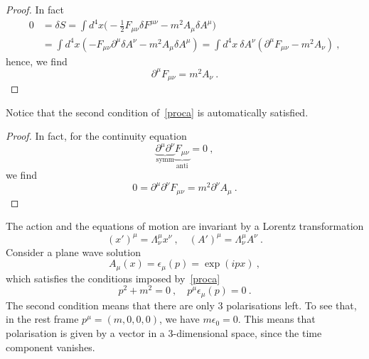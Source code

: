     \begin{proof}
        In fact 
        \begin{equation*}
        \begin{aligned}
            0 & = \delta S = \int d^4 x \Big (- \frac{1}{2} F_{\mu\nu} \delta F^{\mu\nu} - m^2 A_\mu \delta A^\mu \Big ) \\ & = \int d^4 x (-F_{\mu\nu} \partial^\mu \delta A^\nu - m^2 A_\mu \delta A^\mu) = \int d^4 x ~ \delta A^\nu (\partial^\mu F_{\mu\nu} - m^2 A_\nu) ~,
        \end{aligned}
        \end{equation*}
        hence, we find
        \begin{equation*}
            \partial^\mu F_{\mu\nu} = m^2 A_\nu ~.
        \end{equation*}
    \end{proof}
    Notice that the second condition of~\eqref{proca} is automatically satisfied.
    \begin{proof}
        In fact, for the continuity equation
        \begin{equation*}
            \underbrace{\partial^\mu \partial^\nu}_{\text{symm}} \underbrace{F_{\mu\nu}}_{\text{anti}} = 0~,
        \end{equation*}
        we find 
        \begin{equation*}
            0 = \partial^\mu \partial^\nu F_{\mu\nu} = m^2 \partial^\nu A_\mu ~. 
        \end{equation*}
    \end{proof}
    The action and the equations of motion are invariant by a Lorentz transformation 
    \begin{equation*}
        (x')^\mu = \Lambda^\mu_\nu x^\nu ~, \quad (A')^\mu = \Lambda^\mu_\nu A^\nu ~.
    \end{equation*}
    Consider a plane wave solution 
    \begin{equation*}
        A_\mu (x) = \epsilon_\mu (p) = \exp(i p x) ~,
    \end{equation*}
    which satisfies the conditions imposed by~\eqref{proca} 
    \begin{equation*}
        p^2 + m^2 = 0 ~, \quad p^\mu \epsilon_\mu (p) = 0~.
    \end{equation*}
    The second condition means that there are only $3$ polarisations left. To see that, in the rest frame $p^\mu = (m, 0, 0, 0)$, we have $m \epsilon_0 = 0$. This means that polarisation is given by a vector in a $3$-dimensional space, since the time component vanishes.
